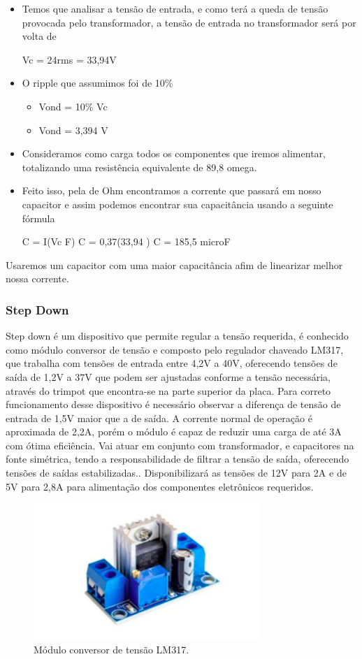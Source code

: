 \begin{itemize}
    \item Temos que analisar a tensão de entrada, e como terá a queda de tensão provocada pelo transformador, a tensão de entrada no transformador será por volta de 
    
    Vc = 24rms = 33,94V
    \item O ripple que assumimos foi de 10\% 
    \begin{itemize}
        \item Vond = 10\% Vc
        \item Vond = 3,394 V
    \end{itemize}
\item Consideramos como carga todos os componentes que iremos alimentar, totalizando uma resistência equivalente de 89,8 omega.
    \item Feito isso, pela de Ohm encontramos a corrente que passará em nosso capacitor e assim podemos encontrar sua capacitância usando a seguinte fórmula
    
    C = I(Vc \* F)
    C = 0,37(33,94 )
    C = 185,5 microF
\end{itemize}

Usaremos um capacitor com uma maior capacitância afim de linearizar melhor nossa corrente.

\subsubsection{Step Down}
Step down é um dispositivo que permite regular a tensão requerida, é conhecido como módulo conversor de tensão e composto pelo regulador chaveado LM317, que trabalha com tensões de entrada entre 4,2V a 40V, oferecendo tensões de saída de 1,2V a 37V que podem ser ajustadas conforme a tensão necessária, através do trimpot que encontra-se na parte superior da placa.
Para correto funcionamento desse dispositivo é necessário observar a diferença de tensão de entrada de 1,5V maior que a de saída. A corrente normal de operação é aproximada de 2,2A, porém o módulo é capaz de reduzir uma carga de até 3A com ótima eficiência.
Vai atuar em conjunto com transformador, e capacitores na fonte simétrica, tendo a responsabilidade de filtrar a tensão de saída, oferecendo tensões de saídas estabilizadas.. Disponibilizará as tensões de 12V para 2A e de 5V para 2,8A para alimentação dos componentes eletrônicos requeridos.

\begin{figure}[!h]
	\centering
		\includegraphics[scale=0.5]{figuras/energia/15.png}
	\caption{Módulo conversor de tensão LM317.}
\end{figure}

